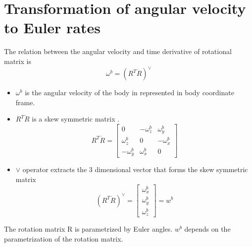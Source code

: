 \section{Transformation of angular velocity to Euler rates}
\label{sec:avel_trfm}
The relation between the angular velocity and time derivative of rotational matrix is $$ \omega^b = (R^T \dot{R}) ^ \vee $$
\begin{itemize}
\item $\omega^b$ is the angular velocity of the body in represented in body coordinate frame. 
\item $R^T \dot{R}$ is a skew symmetric matrix \citep[Chapter 2]{mur94}.
$$ R^T \dot{R} = \begin{bmatrix}
0 &-\omega_z^b &\omega_y^b\\ \omega_z^b &0 &-\omega_x^b \\ -\omega_y^b &\omega_x^b &0 \end{bmatrix}$$
\item $\vee$ operator extracts the 3 dimensional vector that forms the skew symmetric matrix
$$ (R^T \dot{R}) ^ \vee = \begin{bmatrix}\omega_x^b\\ \omega_y^b\\ \omega_z^b \end{bmatrix} = w^b$$
\end{itemize}
The rotation matrix R is parametrized by Euler angles. $w^b$ depends on the parametrization of the rotation matrix.
